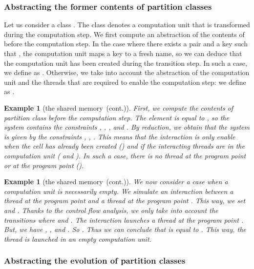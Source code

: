\documentclass{article}
\newcommand{\boxexample}{}
\newtheorem{example}[thm]{Example}
\newcommand{\pp}[1]{}
\newcommand{\memlaba}{1}
\newcommand{\memlabb}{2}
\newcommand{\memlabf}{6}
\newcommand{\memlabm}{13}
\newcommand{\continued}{(cont.)}
\newcommand{\shareanalysis}{the shared memory}
\newcommand{\ccontentanalysis}{\shareanalysis\ \continued}
\begin{document}
\subsubsection{Abstracting the former contents of partition classes}

Let us consider a class . 
The class  denotes a computation unit  that is transformed during the computation step. 
We first compute an abstraction  of the contents of  before the computation step. 
In the case where there exists a pair  and a key  such that ,  the computation unit maps a key to a fresh name, 
so we can deduce that the computation unit  has been created during the transition step. In such a case, we define  as . Otherwise, we take into account the abstraction of the computation unit and the threads that are required to enable the computation step: we define  as .




\begin{example}[\ccontentanalysis]
First, we compute the contents of partition class  before the computation step.
The  element   is equal to 
, so the system  contains the constraints  , , 
, and 
. By reduction, we obtain that the system   is given by the constraints , , .  
This means that the interaction is only enable when the cell has already been created () and if the interacting threads are in the computation unit ( and ). 
In such a case, there is no thread at the program point \pp{\memlabb} or at the program point \pp{\memlabf} (). 
\boxexample\end{example}


\begin{example}[\ccontentanalysis]
We now consider a case when  a computation unit is necessarily empty.
We simulate an interaction between a thread at the program point
\pp{\memlaba} and a thread at the program point \pp{\memlabm}.
This way, we set  and .
Thanks to the control flow analysis, we only take into account the transitions where   and . 
The interaction launches a thread at the program point \pp{\memlabb}.
But, we have  , , and .
So .
Thus we can conclude that  is equal to . This way, the thread is launched in an empty computation unit.
\boxexample\end{example}



\subsubsection{Abstracting the evolution of partition classes}
\end{document}
